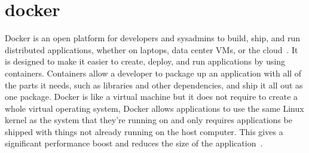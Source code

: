 \section{docker}
Docker is an open platform for developers and sysadmins to build, ship, and run distributed applications, whether on laptops, data center VMs, or the cloud~\cite{docker}. It is designed to make it easier to create, deploy, and run applications by using containers. Containers allow a developer to package up an application with all of the parts it needs, such as libraries and other dependencies, and ship it all out as one package. Docker is like a virtual machine but it does not require to create a whole virtual operating system, Docker allows applications to use the same Linux kernel as the system that they're running on and only requires applications be shipped with things not already running on the host computer. This gives a significant performance boost and reduces the size of the application~\cite{opensource}.
